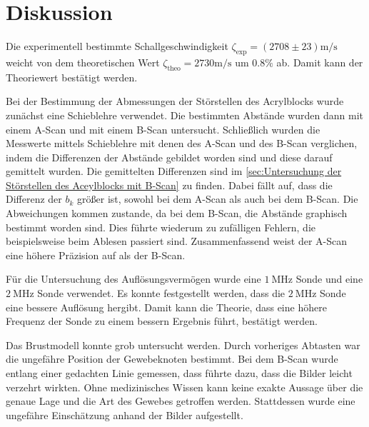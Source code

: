 \section{Diskussion}
\label{sec:diskussion}

Die experimentell bestimmte Schallgeschwindigkeit $\zeta_{\text{exp}} = \left(2708 \pm 23\right) \si{\meter \per \second}$ weicht von dem 
theoretischen Wert $\zeta_{\text{theo}} = 2730 \si{\meter \per \second}$ um $0.8 \%$ ab. Damit kann der Theoriewert bestätigt werden.

Bei der Bestimmung der Abmessungen der Störstellen des Acrylblocks wurde zunächst eine Schieblehre verwendet. Die bestimmten Abstände
wurden dann mit einem A-Scan und mit einem B-Scan untersucht. Schließlich wurden die Messwerte mittels Schieblehre mit denen des A-Scan und des 
B-Scan verglichen, indem die Differenzen der Abstände gebildet worden sind und diese darauf gemittelt wurden. Die gemittelten Differenzen 
sind im \autoref{sec:Untersuchung der Störstellen des Aceylblocks mit B-Scan} zu finden.
Dabei fällt auf, dass die Differenz der $b_k$ größer ist, sowohl bei dem A-Scan als auch bei dem B-Scan.
Die Abweichungen kommen zustande, da bei dem B-Scan, die Abstände graphisch bestimmt worden sind. Dies führte wiederum zu zufälligen Fehlern, die beispielsweise
beim Ablesen passiert sind. Zusammenfassend weist der A-Scan eine höhere Präzision auf als der B-Scan.

Für die Untersuchung des Auflösungsvermögen wurde eine $\SI{1}{\mega\hertz}$ Sonde und eine $\SI{2}{\mega\hertz}$ Sonde verwendet. 
Es konnte festgestellt werden, dass die $\SI{2}{\mega\hertz}$ Sonde eine bessere Auflösung hergibt.
Damit kann die Theorie, dass eine höhere Frequenz der Sonde zu einem bessern Ergebnis führt, bestätigt werden.

Das Brustmodell konnte grob untersucht werden. Durch vorheriges Abtasten war die ungefähre Position der Gewebeknoten bestimmt.
Bei dem B-Scan wurde entlang einer gedachten Linie gemessen, dass führte dazu, dass die Bilder leicht verzehrt wirkten. Ohne medizinisches Wissen 
kann keine exakte Aussage über die genaue Lage und die Art des Gewebes getroffen werden. Stattdessen wurde eine ungefähre Einschätzung anhand der Bilder 
aufgestellt.
